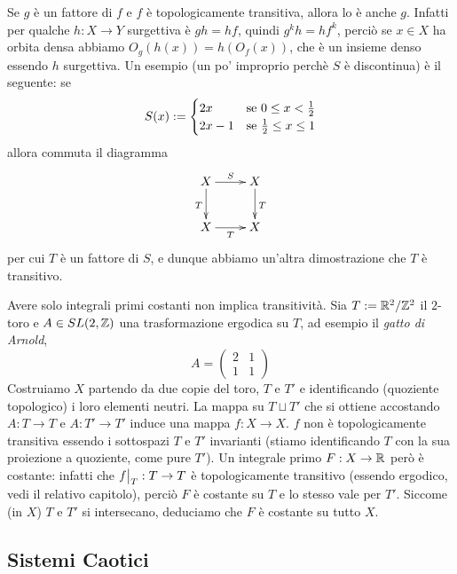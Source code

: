 \begin{esempio} Se $g$ è un fattore di $f$ e $f$ è topologicamente transitiva, allora lo è anche $g$.
Infatti per qualche $h:X\to Y$ surgettiva è $gh=hf$, quindi $g^k h=h f^k$, perciò
se $x\in X$ ha orbita densa abbiamo $O_g(h(x))=h(O_f(x))$, che è un insieme denso essendo $h$ surgettiva.\newline
Un esempio (un po' improprio perchè $S$ è discontinua) è il seguente: se
\[S(x):=\begin{cases}2x &\text{se }0\le x<\frac{1}{2} \\ 2x-1 &\text{se }\frac{1}{2}\le x\le 1\end{cases}\]
allora commuta il diagramma
\[ \xymatrix{X \ar[r]^S \ar[d]_T & X \ar[d]^T \\ X \ar[r]_T & X} \]
per cui $T$ è un fattore di $S$, e dunque abbiamo un'altra dimostrazione che $T$ è transitivo. 
\end{esempio}



\begin{esempio} Avere solo integrali primi costanti non implica transitività. Sia $T:=\mathbb{R}^2/\mathbb{Z}^2$ il $2$-toro e $A\in SL(2,\mathbb{Z})$ una trasformazione ergodica
su $T$, ad esempio il \emph{gatto di Arnold},
\[A=\begin{pmatrix} 2 & 1 \\ 1 & 1 \end{pmatrix}\]
Costruiamo $X$ partendo da due copie del toro, $T$ e $T'$ e identificando (quoziente topologico) i loro elementi neutri. 
La mappa su $T\sqcup T'$ che si ottiene accostando $A:T\to T$ e $A:T'\to T'$ induce una mappa $f:X\to X$.
$f$ non è topologicamente transitiva essendo i sottospazi $T$ e $T'$ invarianti (stiamo identificando $T$ con la sua proiezione a quoziente,
come pure $T'$).
Un integrale primo $F:X\to \mathbb{R}$ però è costante: infatti che $\restr{f}{T}:T\to T$ è topologicamente transitivo 
(essendo ergodico, vedi il relativo capitolo),
perciò $F$ è costante su $T$ e lo stesso vale per $T'$. Siccome (in $X$) $T$ e $T'$ si intersecano, deduciamo che $F$ è costante su tutto $X$. 
\end{esempio}



\subsection{Sistemi Caotici}


